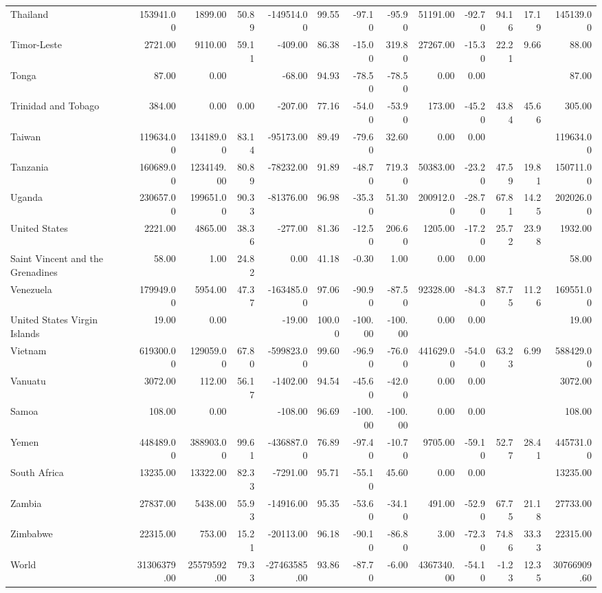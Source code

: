 \begin{table}[ht]
\begin{tabular}{lrrrrrrrrrrrr}
  Thailand & 153941.00 & 1899.00 & 50.89 & -149514.00 & 99.55 & -97.10 & -95.90 & 51191.00 & -92.70 & 94.16 & 17.19 & 145139.00 \\ 
  Timor-Leste & 2721.00 & 9110.00 & 59.11 & -409.00 & 86.38 & -15.00 & 319.80 & 27267.00 & -15.30 & 22.21 & 9.66 & 88.00 \\ 
  Tonga & 87.00 & 0.00 &  & -68.00 & 94.93 & -78.50 & -78.50 & 0.00 & 0.00 &  &  & 87.00 \\ 
  Trinidad and Tobago & 384.00 & 0.00 & 0.00 & -207.00 & 77.16 & -54.00 & -53.90 & 173.00 & -45.20 & 43.84 & 45.66 & 305.00 \\ 
  Taiwan & 119634.00 & 134189.00 & 83.14 & -95173.00 & 89.49 & -79.60 & 32.60 & 0.00 & 0.00 &  &  & 119634.00 \\ 
  Tanzania & 160689.00 & 1234149.00 & 80.89 & -78232.00 & 91.89 & -48.70 & 719.30 & 50383.00 & -23.20 & 47.59 & 19.81 & 150711.00 \\ 
  Uganda & 230657.00 & 199651.00 & 90.33 & -81376.00 & 96.98 & -35.30 & 51.30 & 200912.00 & -28.70 & 67.81 & 14.25 & 202026.00 \\ 
  United States & 2221.00 & 4865.00 & 38.36 & -277.00 & 81.36 & -12.50 & 206.60 & 1205.00 & -17.20 & 25.72 & 23.98 & 1932.00 \\ 
  Saint Vincent and the Grenadines & 58.00 & 1.00 & 24.82 & 0.00 & 41.18 & -0.30 & 1.00 & 0.00 & 0.00 &  &  & 58.00 \\ 
  Venezuela & 179949.00 & 5954.00 & 47.37 & -163485.00 & 97.06 & -90.90 & -87.50 & 92328.00 & -84.30 & 87.75 & 11.26 & 169551.00 \\ 
  United States Virgin Islands & 19.00 & 0.00 &  & -19.00 & 100.00 & -100.00 & -100.00 & 0.00 & 0.00 &  &  & 19.00 \\ 
  Vietnam & 619300.00 & 129059.00 & 67.80 & -599823.00 & 99.60 & -96.90 & -76.00 & 441629.00 & -54.00 & 63.23 & 6.99 & 588429.00 \\ 
  Vanuatu & 3072.00 & 112.00 & 56.17 & -1402.00 & 94.54 & -45.60 & -42.00 & 0.00 & 0.00 &  &  & 3072.00 \\ 
  Samoa & 108.00 & 0.00 &  & -108.00 & 96.69 & -100.00 & -100.00 & 0.00 & 0.00 &  &  & 108.00 \\ 
  Yemen & 448489.00 & 388903.00 & 99.61 & -436887.00 & 76.89 & -97.40 & -10.70 & 9705.00 & -59.10 & 52.77 & 28.41 & 445731.00 \\ 
  South Africa & 13235.00 & 13322.00 & 82.33 & -7291.00 & 95.71 & -55.10 & 45.60 & 0.00 & 0.00 &  &  & 13235.00 \\ 
  Zambia & 27837.00 & 5438.00 & 55.93 & -14916.00 & 95.35 & -53.60 & -34.10 & 491.00 & -52.90 & 67.75 & 21.18 & 27733.00 \\ 
  Zimbabwe & 22315.00 & 753.00 & 15.21 & -20113.00 & 96.18 & -90.10 & -86.80 & 3.00 & -72.30 & 74.86 & 33.33 & 22315.00 \\ 
  World & 31306379.00 & 25579592.00 & 79.33 & -27463585.00 & 93.86 & -87.70 & -6.00 & 4367340.00 & -54.10 & -1.23 & 12.35 & 30766909.60 \\ 
   \hline
\end{tabular}
\end{table}
